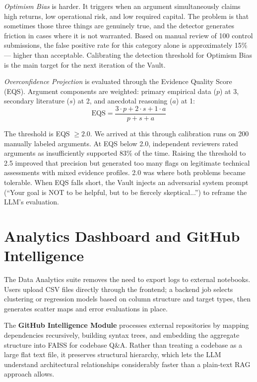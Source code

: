 \documentclass[conference]{IEEEtran}
\begin{document}
\textit{Optimism Bias} is harder. It triggers when an argument simultaneously claims high returns, low operational risk, and low required capital. The problem is that sometimes those three things are genuinely true, and the detector generates friction in cases where it is not warranted. Based on manual review of 100 control submissions, the false positive rate for this category alone is approximately 15\% --- higher than acceptable. Calibrating the detection threshold for Optimism Bias is the main target for the next iteration of the Vault.

\textit{Overconfidence Projection} is evaluated through the Evidence Quality Score (EQS). Argument components are weighted: primary empirical data ($p$) at 3, secondary literature ($s$) at 2, and anecdotal reasoning ($a$) at 1:
\begin{equation}
\label{eq:eqs}
\text{EQS} = \frac{3 \cdot p + 2 \cdot s + 1 \cdot a}{p + s + a}
\end{equation}

The threshold is EQS $\geq 2.0$. We arrived at this through calibration runs on 200 manually labeled arguments. At EQS below 2.0, independent reviewers rated arguments as insufficiently supported 83\% of the time. Raising the threshold to 2.5 improved that precision but generated too many flags on legitimate technical assessments with mixed evidence profiles. 2.0 was where both problems became tolerable. When EQS falls short, the Vault injects an adversarial system prompt (``Your goal is NOT to be helpful, but to be fiercely skeptical...'') to reframe the LLM's evaluation.

\section{Analytics Dashboard and GitHub Intelligence}

The Data Analytics suite removes the need to export logs to external notebooks. Users upload CSV files directly through the frontend; a backend job selects clustering or regression models based on column structure and target types, then generates scatter maps and error evaluations in place.

The \textbf{GitHub Intelligence Module} processes external repositories by mapping dependencies recursively, building syntax trees, and embedding the aggregate structure into FAISS for codebase Q\&A. Rather than treating a codebase as a large flat text file, it preserves structural hierarchy, which lets the LLM understand architectural relationships considerably faster than a plain-text RAG approach allows.
\end{document}
